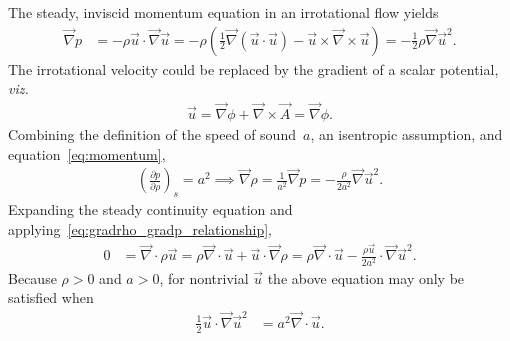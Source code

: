 \documentclass[letterpaper,11pt,nointlimits,reqno]{amsart}
\begin{document}
The steady, inviscid momentum equation in an irrotational flow yields
\begin{align}
    \vec{\nabla}p
    &= -\rho \vec{u}\cdot\vec{\nabla}\vec{u}
     = -\rho \left(   \frac{1}{2}\vec{\nabla}\left(\vec{u}\cdot\vec{u}\right)
                    - \vec{u}\times\vec{\nabla}\times\vec{u}
        \right)
     = - \frac{1}{2} \rho \vec{\nabla}\vec{u}^2
\label{eq:momentum}
.
\end{align}
The irrotational velocity could be replaced by the gradient of a scalar
potential, \emph{viz.}
\begin{align}
  \vec{u} = \vec{\nabla}\phi + \vec{\nabla}\times\vec{A} = \vec{\nabla}{\phi}
  .
\end{align}
Combining the definition of the speed of sound~$a$, an isentropic assumption,
and equation~\eqref{eq:momentum},
\begin{align}
    \left(\frac{\partial p}{\partial \rho}\right)_{s} = a^2
    \implies
    \vec{\nabla}\rho = \frac{1}{a^2} \vec{\nabla} p
                     = - \frac{\rho}{2a^2} \vec{\nabla}\vec{u}^2
\label{eq:gradrho_gradp_relationship}
.
\end{align}
Expanding the steady continuity equation and
applying~\eqref{eq:gradrho_gradp_relationship},
\begin{align}
  0 &= \vec{\nabla}\cdot\rho\vec{u}
     = \rho\vec{\nabla}\cdot\vec{u} + \vec{u}\cdot\vec{\nabla}\rho
     = \rho\vec{\nabla}\cdot\vec{u}
     - \frac{\rho\vec{u}}{2a^2} \cdot \vec{\nabla}\vec{u}^2
\label{eq:continuity}
.
\end{align}
Because $\rho>0$ and $a>0$, for nontrivial $\vec{u}$ the above
equation may only be satisfied when
\begin{align}
       \frac{1}{2} \vec{u}\cdot \vec{\nabla}\vec{u}^2
    &= a^2 \vec{\nabla}\cdot\vec{u}
.
\label{eq:momentum_and_continuity}
\end{align}
\end{document}
